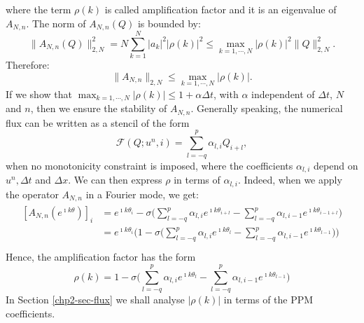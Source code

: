 where the term $\rho(k)$ is called amplification factor and it is an eigenvalue of $A_{N,n}$.
The norm of $A_{N,n}(Q)$ is bounded by:
\begin{equation*}
	\|A_{N,n}(Q)\|_{2,N}^2 = N \sum_{k=1}^{N} |a_k|^2 |\rho(k)|^2 \leq 
	\max_{k=1, \cdots, N}{|\rho(k)|}^2 \|Q\|_{2,N}^2.
\end{equation*}
Therefore:
\begin{equation*}
	\|A_{N,n}\|_{2,N} \leq \max_{k=1, \cdots, N}{|\rho(k)|}.
\end{equation*}
If we show that $\max_{k=1, \cdots, N}{|\rho(k)|} \leq 1 + \alpha \Delta t$, 
with $\alpha$ independent of $\Delta t$, $N$ and $n$, then we ensure the stability of $A_{N,n}$.
Generally speaking, the numerical flux can be written as a stencil of the form
\begin{equation*}
	\mathcal{F}(Q; u^n,i) = \sum_{l=-q}^p \alpha_{l,i} Q_{i+l}, 
\end{equation*}
when no monotonicity constraint is imposed, 
where the coefficients $\alpha_{l,i}$ depend on $u^n, \Delta t$ and $\Delta x$.
We can then express $\rho$ in terms of $\alpha_{l,i}$.
Indeed, when we apply the operator $A_{N,n}$ in a Fourier mode, we get:
\begin{align*}
	\begin{split}
		[A_{N,n}(e^{\imath k\theta})]_i &= e^{\imath k\theta_i} - \sigma 
																\bigg(\sum_{l=-q}^p \alpha_{l,i}   e^{\imath k\theta_{i+l}} - 
																			\sum_{l=-q}^p \alpha_{l,i-1} e^{\imath k\theta_{i-1+l}} \bigg)\\
		&= e^{\imath k \theta_i}\bigg(1 - \sigma 
																			\bigg(\sum_{l=-q}^p \alpha_{l,i}   e^{\imath k\theta_{l}} - 
																			\sum_{l=-q}^p \alpha_{l,i-1} e^{\imath k\theta_{l-1}} \bigg) \bigg)\\
	\end{split}
\end{align*}
Hence, the amplification factor has the form
\begin{equation}
\label{chp2-amplification}
\rho(k) = 1 - \sigma
					\bigg(\sum_{l=-q}^p \alpha_{l,i}   e^{\imath k\theta_{l}} - 
					\sum_{l=-q}^p \alpha_{l,i-1} e^{\imath k\theta_{l-1}} \bigg)
\end{equation}
In Section \ref{chp2-sec-flux} we shall analyse $|\rho(k)|$ in terms of the PPM coefficients.


